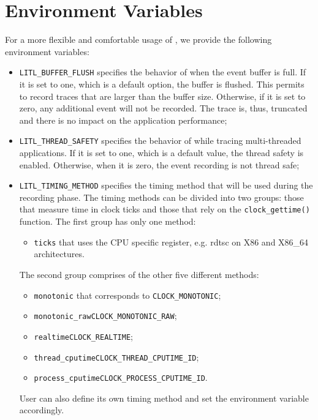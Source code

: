 \section{Environment Variables}
For a more flexible and comfortable usage of \litl{}, we provide the following 
environment variables:
\begin{itemize}
 \item \texttt{LITL\_BUFFER\_FLUSH} specifies the behavior of \litl{} when the 
       event buffer is full. If it is set to one, which is a default option, 
       the buffer is flushed. This permits to record traces that are larger 
       than the buffer size. Otherwise, if it is set to zero, any additional 
       event will not be recorded. The trace is, thus, truncated and there is no 
       impact on the application performance;

 \item \texttt{LITL\_THREAD\_SAFETY} specifies the behavior of \litl{} while
       tracing multi-threaded applications. If it is set to one, which is a 
       default value, the thread safety is enabled. Otherwise, when it is zero, 
       the event recording is not thread safe;
 
 \item \texttt{LITL\_TIMING\_METHOD} specifies the timing method that will be 
       used during the recording phase. The \litl{} timing methods can be 
       divided into two groups: those that measure time in clock ticks and 
       those that rely on the \texttt{clock\_gettime()} function. The first 
       group has only one method:
       \begin{itemize}
        \item \texttt{ticks} that uses the CPU specific register, e.g. rdtsc 
        on X86 and X86\_64 architectures.
       \end{itemize}     
       The second group comprises of the other five different methods:
       \begin{itemize}
        \item \texttt{monotonic} that corresponds to \texttt{CLOCK\_MONOTONIC};
        \item \texttt{monotonic\_raw}\dash{}\texttt{CLOCK\_MONOTONIC\_RAW};
        \item \texttt{realtime}\dash{}\texttt{CLOCK\_REALTIME};
        \item \texttt{thread\_cputime}\dash{}\texttt{CLOCK\_THREAD\_CPUTIME\_ID};        
        \item \texttt{process\_cputime}\dash{}\texttt{CLOCK\_PROCESS\_CPUTIME\_ID}.
       \end{itemize}
       User can also define its own timing method and set the environment 
       variable accordingly.
\end{itemize}


